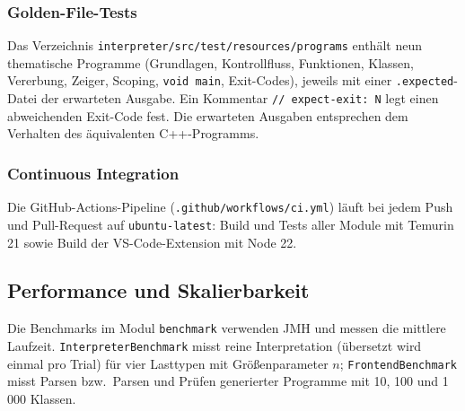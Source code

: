 \documentclass[11pt,a4paper,parskip=half,headsepline,toc=flat]{scrartcl}
\newcommand{\code}[1]{\texttt{#1}}
\begin{document}
\subsubsection*{Golden-File-Tests}
Das Verzeichnis \code{interpreter/src/test/resources/programs} enthält neun thematische Programme (Grundlagen,
Kontrollfluss, Funktionen, Klassen, Vererbung, Zeiger, Scoping, \code{void main}, Exit-Codes), jeweils mit einer
\code{.expected}-Datei der erwarteten Ausgabe. Ein Kommentar \code{// expect-exit: N} legt einen abweichenden
Exit-Code fest. Die erwarteten Ausgaben entsprechen dem Verhalten des äquivalenten C++-Programms.

\subsubsection*{Continuous Integration}
Die GitHub-Actions-Pipeline (\code{.github/workflows/ci.yml}) läuft bei jedem Push und Pull-Request auf
\code{ubuntu-latest}: Build und Tests aller Module mit Temurin 21 sowie Build der VS-Code-Extension mit Node 22.

\subsection{Performance und Skalierbarkeit}\label{sec:perf}
Die Benchmarks im Modul \code{benchmark} verwenden JMH und messen die mittlere Laufzeit.
\code{InterpreterBenchmark} misst reine Interpretation (übersetzt wird einmal pro Trial) für vier Lasttypen mit
Größenparameter $n$; \code{FrontendBenchmark} misst Parsen bzw.\ Parsen und Prüfen generierter Programme mit 10, 100
und 1\,000 Klassen.
\end{document}
